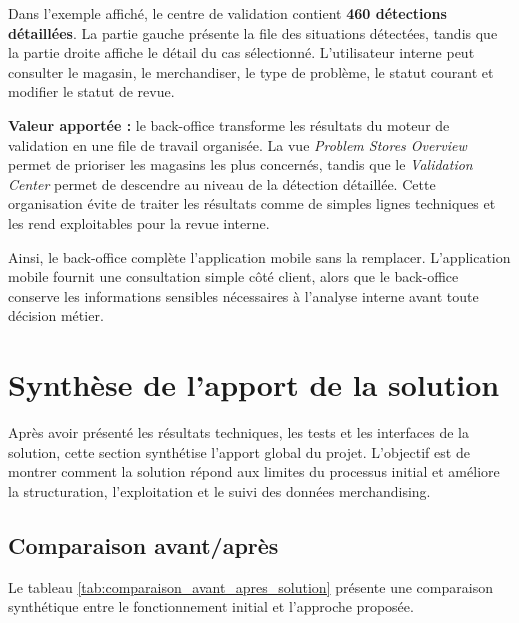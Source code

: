 Dans l’exemple affiché, le centre de validation contient \textbf{460 détections détaillées}. La partie gauche présente la file des situations détectées, tandis que la partie droite affiche le détail du cas sélectionné. L’utilisateur interne peut consulter le magasin, le merchandiser, le type de problème, le statut courant et modifier le statut de revue.

\textbf{Valeur apportée :} le back-office transforme les résultats du moteur de validation en une file de travail organisée. La vue \textit{Problem Stores Overview} permet de prioriser les magasins les plus concernés, tandis que le \textit{Validation Center} permet de descendre au niveau de la détection détaillée. Cette organisation évite de traiter les résultats comme de simples lignes techniques et les rend exploitables pour la revue interne.

Ainsi, le back-office complète l’application mobile sans la remplacer. L’application mobile fournit une consultation simple côté client, alors que le back-office conserve les informations sensibles nécessaires à l’analyse interne avant toute décision métier.

\section{Synthèse de l’apport de la solution}

Après avoir présenté les résultats techniques, les tests et les interfaces de la solution, cette section synthétise l’apport global du projet. L’objectif est de montrer comment la solution répond aux limites du processus initial et améliore la structuration, l’exploitation et le suivi des données merchandising.

\subsection{Comparaison avant/après}

Le tableau \ref{tab:comparaison_avant_apres_solution} présente une comparaison synthétique entre le fonctionnement initial et l’approche proposée.

